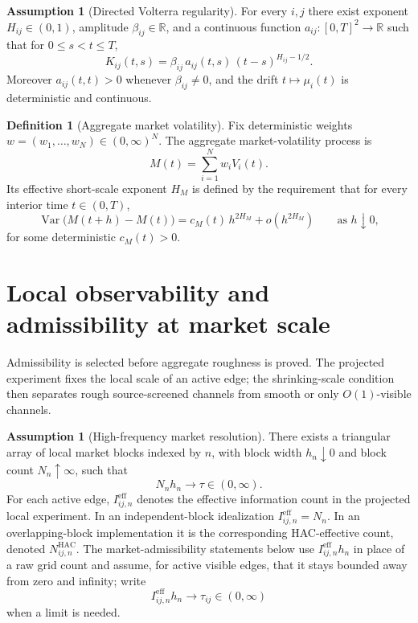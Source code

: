 \documentclass[11pt,a4paper]{amsart}
\theoremstyle{plain}
\theoremstyle{definition}
\newtheorem{definition}[theorem]{Definition}
\newtheorem{assumption}[theorem]{Assumption}
\theoremstyle{remark}
\DeclareMathOperator{\Var}{Var}
\newcommand{\R}{\mathbb{R}}
\begin{document}
\begin{assumption}[Directed Volterra regularity]\label{ass:volterra-market}
For every \(i,j\) there exist exponent \(H_{ij}\in(0,1)\), amplitude \(\beta_{ij}\in\R\), and a
continuous function \(a_{ij}\colon [0,T]^2\to\R\) such that for \(0\le s<t\le T\),
\[
        K_{ij}(t,s)
        =
        \beta_{ij}\,a_{ij}(t,s)\,(t-s)^{H_{ij}-1/2}.
\]
Moreover \(a_{ij}(t,t)>0\) whenever \(\beta_{ij}\neq0\), and the drift \(t\mapsto \mu_i(t)\) is
deterministic and continuous.
\end{assumption}

\begin{definition}[Aggregate market volatility]
Fix deterministic weights \(w=(w_1,\dots,w_N)\in(0,\infty)^N\).  The aggregate market-volatility
process is
\[
        M(t)
        =
        \sum_{i=1}^N w_i V_i(t).
\]
Its effective short-scale exponent \(H_M\) is defined by the requirement that for every interior
time \(t\in(0,T)\),
\[
        \Var\bigl(M(t+h)-M(t)\bigr)
        =
        c_M(t)\,h^{2H_M}
        +o(h^{2H_M})
        \qquad
        \text{as } h\downarrow0,
\]
for some deterministic \(c_M(t)>0\).
\end{definition}

\section{Local observability and admissibility at market scale}\label{sec:admissibility}

Admissibility is selected before aggregate roughness is proved.  The projected experiment fixes the
local scale of an active edge; the shrinking-scale condition then separates rough source-screened
channels from smooth or only \(O(1)\)-visible channels.

\begin{assumption}[High-frequency market resolution]\label{ass:market-resolution}
There exists a triangular array of local market blocks indexed by \(n\), with block width
\(h_n\downarrow0\) and block count \(N_n\uparrow\infty\), such that
\[
        N_n h_n \to \tau\in(0,\infty).
\]
For each active edge, \(I_{ij,n}^{\mathrm{eff}}\) denotes the effective information count in the
projected local experiment.  In an independent-block idealization
\(I_{ij,n}^{\mathrm{eff}}=N_n\).  In an overlapping-block implementation it is the corresponding
HAC-effective count, denoted \(N_{ij,n}^{\mathrm{HAC}}\).  The market-admissibility statements below
use \(I_{ij,n}^{\mathrm{eff}}h_n\) in place of a raw grid count and assume, for active visible
edges, that it stays bounded away from zero and infinity; write
\[
        I_{ij,n}^{\mathrm{eff}}h_n\to\tau_{ij}\in(0,\infty)
\]
when a limit is needed.
\end{assumption}
\end{document}
